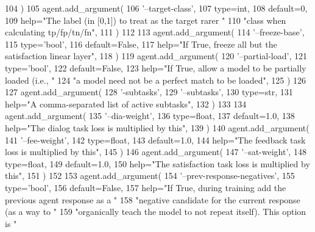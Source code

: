\begin{DoxyCode}
104         )
105         agent.add\_argument(
106             \textcolor{stringliteral}{'--target-class'},
107             type=int,
108             default=0,
109             help=\textcolor{stringliteral}{"The label (in [0,1]) to treat as the target rarer "}
110             \textcolor{stringliteral}{"class when calculating tp/fp/tn/fn"},
111         )
112 
113         agent.add\_argument(
114             \textcolor{stringliteral}{'--freeze-base'},
115             type=\textcolor{stringliteral}{'bool'},
116             default=\textcolor{keyword}{False},
117             help=\textcolor{stringliteral}{"If True, freeze all but the satisfaction linear layer"},
118         )
119         agent.add\_argument(
120             \textcolor{stringliteral}{'--partial-load'},
121             type=\textcolor{stringliteral}{'bool'},
122             default=\textcolor{keyword}{False},
123             help=\textcolor{stringliteral}{"If True, allow a model to be partially loaded (i.e., "}
124             \textcolor{stringliteral}{"a model need not be a perfect match to be loaded"},
125         )
126 
127         agent.add\_argument(
128             \textcolor{stringliteral}{'-subtasks'},
129             \textcolor{stringliteral}{'--subtasks'},
130             type=str,
131             help=\textcolor{stringliteral}{"A comma-separated list of active subtasks"},
132         )
133 
134         agent.add\_argument(
135             \textcolor{stringliteral}{'--dia-weight'},
136             type=float,
137             default=1.0,
138             help=\textcolor{stringliteral}{"The dialog task loss is multiplied by this"},
139         )
140         agent.add\_argument(
141             \textcolor{stringliteral}{'--fee-weight'},
142             type=float,
143             default=1.0,
144             help=\textcolor{stringliteral}{"The feedback task loss is multiplied by this"},
145         )
146         agent.add\_argument(
147             \textcolor{stringliteral}{'--sat-weight'},
148             type=float,
149             default=1.0,
150             help=\textcolor{stringliteral}{"The satisfaction task loss is multiplied by this"},
151         )
152 
153         agent.add\_argument(
154             \textcolor{stringliteral}{'--prev-response-negatives'},
155             type=\textcolor{stringliteral}{'bool'},
156             default=\textcolor{keyword}{False},
157             help=\textcolor{stringliteral}{"If True, during training add the previous agent response as a "}
158             \textcolor{stringliteral}{"negative candidate for the current response (as a way to "}
159             \textcolor{stringliteral}{"organically teach the model to not repeat itself). This option is "}

\end{DoxyCode}
